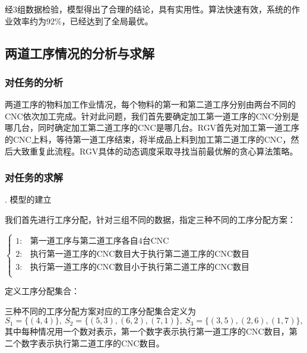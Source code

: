 \documentclass[no-math,withoutpreface,bwprint]{cumcmthesis} %
\numberwithin{equation}{section}
\numberwithin{figure}{section}
\numberwithin{table}{section}
\begin{document}
经3组数据检验，模型得出了合理的结论，具有实用性。算法快速有效，系统的作业效率约为92\%，已经达到了全局最优。

\subsection{两道工序情况的分析与求解}

\subsubsection{对任务的分析}

两道工序的物料加工作业情况，每个物料的第一和第二道工序分别由两台不同的CNC依次加工完成。针对此问题，我们首先要确定加工第一道工序的CNC分别是哪几台，同时确定加工第二道工序的CNC是哪几台。RGV首先对加工第一道工序的CNC上料，等待第一道工序结束，将半成品上料到加工第二道工序的CNC，然后大致重复此流程。RGV具体的动态调度采取寻找当前最优解的贪心算法策略。

\subsubsection{对任务的求解}


. 模型的建立

我们首先进行工序分配，针对三组不同的数据，指定三种不同的工序分配方案：

\vspace{0.4cm}
$\left\{\begin{array}{ll}
1:&\text{第一道工序与第二道工序各自4台CNC}\\
2:&\text{执行第一道工序的CNC数目大于执行第二道工序的CNC数目}\\
3:&\text{执行第一道工序的CNC数目小于执行第二道工序的CNC数目}\\
\end{array}\right.$

\vspace{0.4cm}

定义工序分配集合：
\begin{definition}
三种不同的工序分配方案对应的工序分配集合定义为
$$S_1=\{(4,4)\},\ S_2=\{(5,3),(6,2),(7,1)\},\ S_3=\{(3,5),(2,6),(1,7)\},$$
其中每种情况用一个数对表示，第一个数字表示执行第一道工序的CNC数目，第二个数字表示执行第二道工序的CNC数目。
\end{definition}
%
%
%
\end{document}
